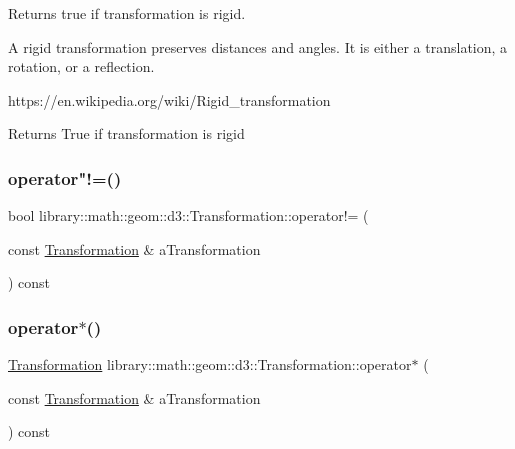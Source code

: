 Returns true if transformation is rigid. 

A rigid transformation preserves distances and angles. It is either a translation, a rotation, or a reflection.

https\+://en.wikipedia.\+org/wiki/\+Rigid\+\_\+transformation

\begin{DoxyReturn}{Returns}
True if transformation is rigid 
\end{DoxyReturn}
\mbox{\label{classlibrary_1_1math_1_1geom_1_1d3_1_1_transformation_ac231beeb8ada73eada915903af7c56b1}} 
\subsubsection{\texorpdfstring{operator"!=()}{operator!=()}}
{\footnotesize\ttfamily bool library\+::math\+::geom\+::d3\+::\+Transformation\+::operator!= (\begin{DoxyParamCaption}\item[{const \hyperlink{classlibrary_1_1math_1_1geom_1_1d3_1_1_transformation}{Transformation} \&}]{a\+Transformation }\end{DoxyParamCaption}) const}

\mbox{\label{classlibrary_1_1math_1_1geom_1_1d3_1_1_transformation_ad2ac7373f1e8a55ca22da045a5853c18}} 
\subsubsection{\texorpdfstring{operator$\ast$()}{operator*()}\hspace{0.1cm}{\footnotesize\ttfamily [1/2]}}
{\footnotesize\ttfamily \hyperlink{classlibrary_1_1math_1_1geom_1_1d3_1_1_transformation}{Transformation} library\+::math\+::geom\+::d3\+::\+Transformation\+::operator$\ast$ (\begin{DoxyParamCaption}\item[{const \hyperlink{classlibrary_1_1math_1_1geom_1_1d3_1_1_transformation}{Transformation} \&}]{a\+Transformation }\end{DoxyParamCaption}) const}

